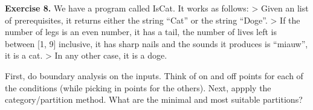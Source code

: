 \textbf{Exercise 8.} We have a program called IsCat. It works as
follows: \textgreater{} Given an list of prerequisites, it returns
either the string ``Cat'' or the string ``Doge''. \textgreater{} If the
number of legs is an even number, it has a tail, the number of lives
left is between {[}1, 9{]} inclusive, it has sharp nails and the sounds
it produces is ``miauw'', it is a cat. \textgreater{} In any other case,
it is a doge.

First, do boundary analysis on the inputs. Think of on and off points
for each of the conditions (while picking in points for the others).
Next, appply the category/partition method. What are the minimal and
most suitable partitions?

\begin{Shaded}
\begin{Highlighting}[]
 
       \NormalTok{;}


\end{Highlighting}
\end{Shaded}
